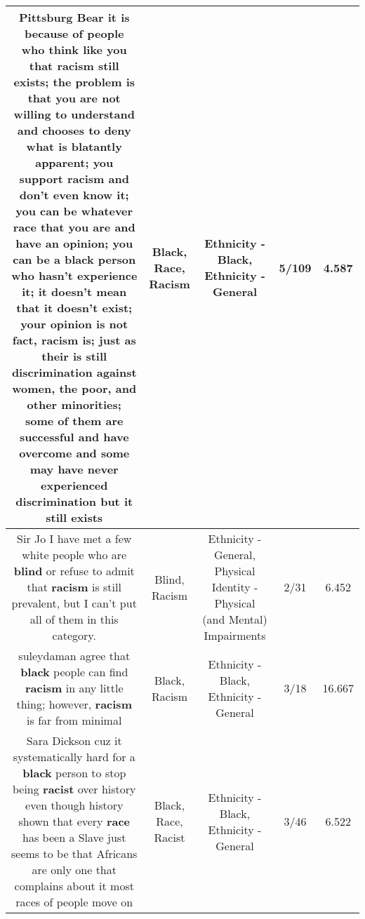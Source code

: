 \documentclass[11pt]{article}
\newlength\mylength
\begin{document}
\begin{center}
\begin{longtable}{|C{.65\mylength}|C{.30\mylength}|C{.12\mylength}|C{.12\mylength}|C{.12\mylength}|}
  \small Pittsburg Bear    it is because of people who think like you that \textbf{racism} still exists; the problem is that you are not willing to understand and chooses to deny what is blatantly apparent; you support \textbf{racism} and don't even know it; you can be whatever \textbf{race} that you are and have an opinion; you can be a \textbf{black} person who hasn't experience it; it doesn't mean that it doesn't exist; your opinion is not fact, \textbf{racism} is; just as their is still discrimination against women, the poor, and other minorities; some of them are successful and have overcome and some may have never experienced discrimination but it still exists\normalsize   & Black, Race, Racism & Ethnicity - Black, Ethnicity - General & 5/109 & 4.587 \\  \hline
  \small Sir Jo   I have met a few white people who are \textbf{blind} or refuse to admit that \textbf{racism} is still prevalent, but I can't put all of them in this category.\normalsize   & Blind, Racism & Ethnicity - General, Physical Identity - Physical (and Mental) Impairments & 2/31 & 6.452 \\  \hline
  \small suleydaman  agree that \textbf{black} people can find \textbf{racism} in any little thing; however, \textbf{racism} is far from minimal\normalsize   & Black, Racism & Ethnicity - Black, Ethnicity - General & 3/18 & 16.667 \\  \hline
  \small Sara Dickson cuz it systematically hard for a \textbf{black} person to stop being \textbf{racist} over history even though history shown that every \textbf{race} has been a Slave just seems to be that Africans are only one that complains about it most races of  people move on\normalsize   & Black, Race, Racist & Ethnicity - Black, Ethnicity - General & 3/46 & 6.522 \\  \hline

\end{longtable}
\end{center}
\end{document}
